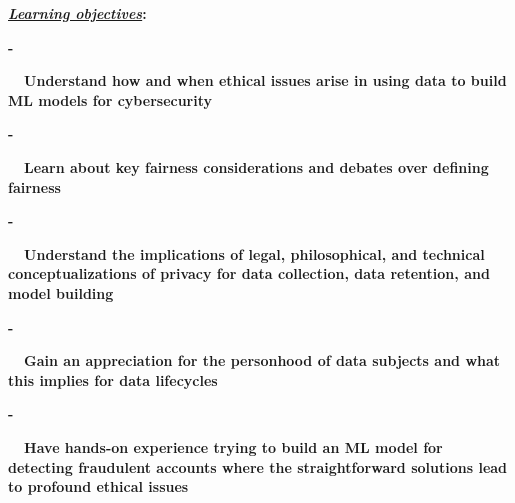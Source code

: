 \documentclass[12pt]{article}
\renewcommand{\_}{\kern-1.5pt\textunderscore\kern-1.5pt}
\begin{document}
\textbf{ }\par

\textbf{\textit{\uline{Learning objectives}}:}\par

\begin{adjustwidth}{0.5in}{0.0in}
\textbf{-}{\fontsize{7pt}{8.4pt}\selectfont \textbf{\ \  \tab Understand how and when ethical issues arise in using data to build ML models for cybersecurity}\par}\par

\end{adjustwidth}

\begin{adjustwidth}{0.5in}{0.0in}
\textbf{-}{\fontsize{7pt}{8.4pt}\selectfont \textbf{\ \  \tab Learn about key fairness considerations and debates over defining fairness}\par}\par

\end{adjustwidth}

\begin{adjustwidth}{0.5in}{0.0in}
\textbf{-}{\fontsize{7pt}{8.4pt}\selectfont \textbf{\ \  \tab Understand the implications of legal, philosophical, and technical conceptualizations of privacy for data collection, data retention, and model building}\par}\par

\end{adjustwidth}

\begin{adjustwidth}{0.5in}{0.0in}
\textbf{-}{\fontsize{7pt}{8.4pt}\selectfont \textbf{\ \  \tab Gain an appreciation for the personhood of data subjects and what this implies for data lifecycles}\par}\par

\end{adjustwidth}

\begin{adjustwidth}{0.5in}{0.0in}
\textbf{-}{\fontsize{7pt}{8.4pt}\selectfont \textbf{\ \  \tab Have hands-on experience trying to build an ML model for detecting fraudulent accounts where the straightforward solutions lead to profound ethical issues}\par}\par

\end{adjustwidth}
\end{document}

